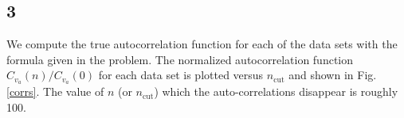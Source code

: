 \documentclass[singlepage,notitlepage,nofootinbib,11pt]{revtex4-1}
\begin{document}
\subsection{3}
We compute the true autocorrelation function for each of the data sets with the formula given in the problem. The normalized autocorrelation function $C_{v_a}(n)/C_{v_a}(0)$ for each data set is plotted versus $n_{\text{cut}}$ and shown in Fig. \ref{corrs}. The value of $n$ (or $n_{\text{cut}}$) which the auto-correlations disappear is roughly 100.
\begin{figure}[h]
  \centering
  \captionsetup[subfigure]{labelformat=empty}
  \\
  \\

\end{figure}
\end{document}
